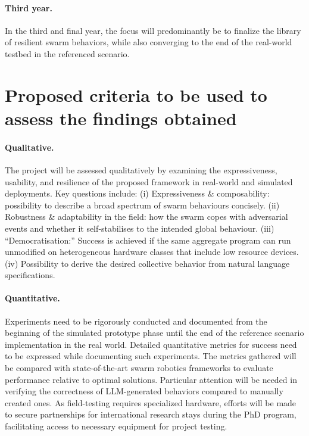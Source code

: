 \documentclass[12pt]{article}
\begin{document}
\paragraph{Third year.} In the third and final year, the focus will predominantly be to finalize the library of resilient swarm behaviors, while also converging to the end of the real-world testbed in the referenced scenario.

\section{Proposed criteria to be used to assess the findings obtained}

\paragraph{Qualitative.}
The project will be assessed qualitatively by examining the expressiveness, usability, and resilience of the proposed framework in real-world and simulated deployments.  
Key questions include:  
(i) Expressiveness \& composability: possibility to describe a broad spectrum of swarm behaviours concisely. 
(ii) Robustness \& adaptability in the field: how the swarm copes with adversarial events and whether it self‑stabilises to the intended global behaviour.  
(iii) “Democratisation:” Success is achieved if the same aggregate program can run unmodified on heterogeneous hardware classes that include low resource devices.
(iv) Possibility to derive the desired collective behavior from natural language specifications.

\paragraph{Quantitative.}
Experiments need to be rigorously conducted and documented from the beginning of the simulated prototype phase until the end of the reference scenario implementation in the real world.
Detailed quantitative metrics for success need to be expressed while documenting such experiments. 
The metrics gathered will be compared with state-of-the-art swarm robotics frameworks to evaluate performance relative to optimal solutions.
Particular attention will be needed in verifying the correctness of LLM-generated behaviors compared to manually created ones.
As field-testing requires specialized hardware, efforts will be made to secure partnerships for international research stays during the PhD program, facilitating access to necessary equipment for project testing.
\end{document}
